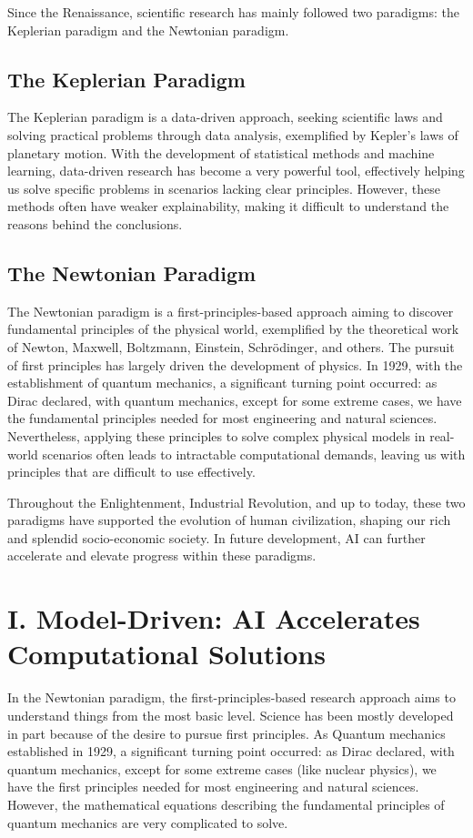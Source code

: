 Since the Renaissance, scientific research has mainly followed two paradigms: the Keplerian paradigm and the Newtonian paradigm.

\subsection*{The Keplerian Paradigm}
The Keplerian paradigm is a data-driven approach, seeking scientific laws and solving practical problems through data analysis, exemplified by Kepler's laws of planetary motion. With the development of statistical methods and machine learning, data-driven research has become a very powerful tool, effectively helping us solve specific problems in scenarios lacking clear principles. However, these methods often have weaker explainability, making it difficult to understand the reasons behind the conclusions.

\subsection*{The Newtonian Paradigm}
The Newtonian paradigm is a first-principles-based approach aiming to discover fundamental principles of the physical world, exemplified by the theoretical work of Newton, Maxwell, Boltzmann, Einstein, Schrödinger, and others. The pursuit of first principles has largely driven the development of physics. In 1929, with the establishment of quantum mechanics, a significant turning point occurred: as Dirac declared, with quantum mechanics, except for some extreme cases, we have the fundamental principles needed for most engineering and natural sciences. Nevertheless, applying these principles to solve complex physical models in real-world scenarios often leads to intractable computational demands, leaving us with principles that are difficult to use effectively.

Throughout the Enlightenment, Industrial Revolution, and up to today, these two paradigms have supported the evolution of human civilization, shaping our rich and splendid socio-economic society. In future development, AI can further accelerate and elevate progress within these paradigms.

\section*{I. Model-Driven: AI Accelerates Computational Solutions}
In the Newtonian paradigm, the first-principles-based research approach aims to understand things from the most basic level. Science has been mostly developed in part because of the desire to pursue first principles. As Quantum mechanics established in 1929, a significant turning point occurred: as Dirac declared, with quantum mechanics, except for some extreme cases (like nuclear physics), we have the first principles needed for most engineering and natural sciences. However, the mathematical equations describing the fundamental principles of quantum mechanics are very complicated to solve.


